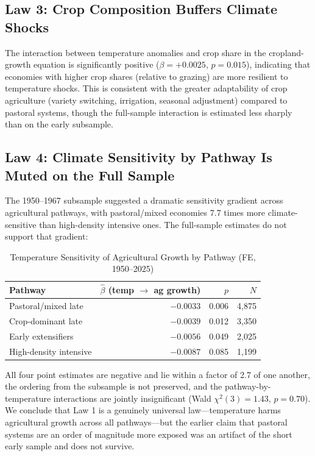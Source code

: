 \documentclass[12pt,letterpaper]{article}
\begin{document}
\subsection{Law 3: Crop Composition Buffers Climate Shocks}

The interaction between temperature anomalies and crop share in the cropland-growth equation is significantly positive ($\beta = +0.0025$, $p = 0.015$), indicating that economies with higher crop shares (relative to grazing) are more resilient to temperature shocks. This is consistent with the greater adaptability of crop agriculture (variety switching, irrigation, seasonal adjustment) compared to pastoral systems, though the full-sample interaction is estimated less sharply than on the early subsample.

\subsection{Law 4: Climate Sensitivity by Pathway Is Muted on the Full Sample}

The 1950--1967 subsample suggested a dramatic sensitivity gradient across agricultural pathways, with pastoral/mixed economies 7.7 times more climate-sensitive than high-density intensive ones. The full-sample estimates do not support that gradient:

\begin{table}[H]
\centering
\caption{Temperature Sensitivity of Agricultural Growth by Pathway (FE, 1950--2025)}
\label{tab:sensitivity}
\small
\begin{tabular}{lrrr}
\toprule
Pathway & $\hat{\beta}$ (temp $\to$ ag growth) & $p$ & $N$ \\
\midrule
Pastoral/mixed late & $-0.0033$ & 0.006 & 4,875 \\
Crop-dominant late & $-0.0039$ & 0.012 & 3,350 \\
Early extensifiers & $-0.0056$ & 0.049 & 2,025 \\
High-density intensive & $-0.0087$ & 0.085 & 1,199 \\
\bottomrule
\end{tabular}
\end{table}

All four point estimates are negative and lie within a factor of 2.7 of one another, the ordering from the subsample is not preserved, and the pathway-by-temperature interactions are jointly insignificant (Wald $\chi^2(3) = 1.43$, $p = 0.70$). We conclude that Law 1 is a genuinely universal law---temperature harms agricultural growth across all pathways---but the earlier claim that pastoral systems are an order of magnitude more exposed was an artifact of the short early sample and does not survive.
\end{document}

